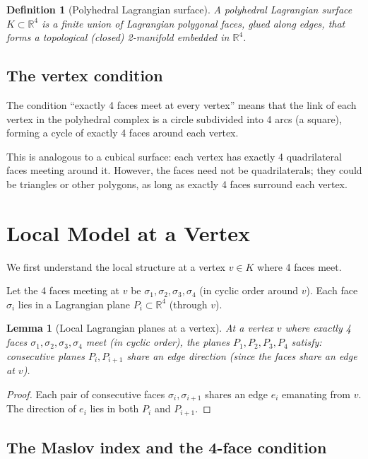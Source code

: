 \documentclass[12pt]{article}
\newtheorem{lemma}[theorem]{Lemma}
\newtheorem{definition}[theorem]{Definition}
\begin{document}
\begin{definition}[Polyhedral Lagrangian surface]
A polyhedral Lagrangian surface $K \subset \mathbb{R}^4$ is a finite union of Lagrangian polygonal faces, glued along edges, that forms a topological (closed) 2-manifold embedded in $\mathbb{R}^4$.
\end{definition}

\subsection{The vertex condition}

The condition ``exactly 4 faces meet at every vertex'' means that the link of each vertex in the polyhedral complex is a circle subdivided into 4 arcs (a square), forming a cycle of exactly 4 faces around each vertex.

This is analogous to a cubical surface: each vertex has exactly 4 quadrilateral faces meeting around it. However, the faces need not be quadrilaterals; they could be triangles or other polygons, as long as exactly 4 faces surround each vertex.

\section{Local Model at a Vertex}

We first understand the local structure at a vertex $v \in K$ where 4 faces meet.

Let the 4 faces meeting at $v$ be $\sigma_1, \sigma_2, \sigma_3, \sigma_4$ (in cyclic order around $v$). Each face $\sigma_i$ lies in a Lagrangian plane $P_i \subset \mathbb{R}^4$ (through $v$).

\begin{lemma}[Local Lagrangian planes at a vertex]\label{lem:local}
At a vertex $v$ where exactly 4 faces $\sigma_1, \sigma_2, \sigma_3, \sigma_4$ meet (in cyclic order), the planes $P_1, P_2, P_3, P_4$ satisfy: consecutive planes $P_i, P_{i+1}$ share an edge direction (since the faces share an edge at $v$).
\end{lemma}

\begin{proof}
Each pair of consecutive faces $\sigma_i, \sigma_{i+1}$ shares an edge $e_i$ emanating from $v$. The direction of $e_i$ lies in both $P_i$ and $P_{i+1}$.
\end{proof}

\subsection{The Maslov index and the 4-face condition}
\end{document}
